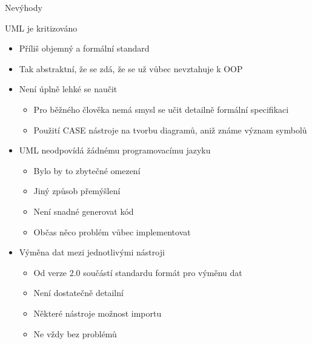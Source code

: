 
\begin{frame}{Nevýhody}

\onslide<+-> UML je kritizováno

\begin{itemize}[<+->]
	\item Příliš objemný a formální standard
	\item Tak abstraktní, že se zdá, že se už vůbec nevztahuje k OOP
	\item Není úplně lehké se naučit
	\begin{itemize}[<+->]
		\item Pro běžného člověka nemá smysl se učit detailně formální
		specifikaci
		\item Použití CASE nástroje na tvorbu diagramů, aniž známe 
		význam symbolů
	\end{itemize}	
	
	\item UML neodpovídá žádnému programovacímu jazyku
	\begin{itemize}[<+->]
		\item Bylo by to zbytečné omezení
		\item Jiný způsob přemýšlení
		\item Není snadné generovat kód
		\item Občas něco problém vůbec implementovat
	\end{itemize}
	
	\item Výměna dat mezi jednotlivými nástroji
	\begin{itemize}[<+->]
		\item Od verze 2.0 součástí standardu formát pro výměnu dat
		\item Není dostatečně detailní
		\item Některé nástroje možnost importu
		\item Ne vždy bez problémů
	\end{itemize}
\end{itemize}


\end{frame}


